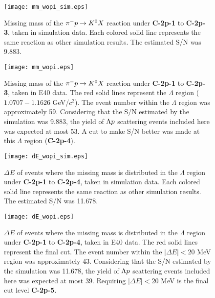 \begin{figure}[!h]
  \begin{center}
    \texttt{[image: mm\_wopi\_sim.eps]}
    \caption{Missing mass of the $\pi^- p \to K^0 X$ reaction under {\bf C-2p-1} to {\bf C-2p-3}, taken in simulation data. Each colored solid line represents the same reaction as other simulation results. The estimated S/N was 9.883.}
    \label{fig-mm_wopi_sim}
  \end{center}
\end{figure}

\begin{figure}[!h]
  \begin{center}
    \texttt{[image: mm\_wopi.eps]}
    \caption{Missing mass of the $\pi^- p \to K^0 X$ reaction under {\bf C-2p-1} to {\bf C-2p-3}, taken in E40 data. The red solid lines represent the $\Lambda$ region ($1.0707-1.1626$ GeV/$c^{2}$). The event number within the $\Lambda$ region was approximately 59. Considering that the S/N estimated by the simulation was 9.883, the yield of $\Lambda p$ scattering events included here was expected at most 53. A cut to make S/N better was made at this $\Lambda$ region ({\bf C-2p-4}).}
    \label{fig-mm_wopi}
  \end{center}
\end{figure}

\begin{figure}[!h]
  \begin{center}
    \texttt{[image: dE\_wopi\_sim.eps]}
    \caption{$\Delta E$ of events where the missing mass is distributed in the $\Lambda$ region under {\bf C-2p-1} to {\bf C-2p-4}, taken in simulation data. Each colored solid line represents the same reaction as other simulation results. The estimated S/N was 11.678.}
    \label{fig-dE_wopi_sim}
  \end{center}
\end{figure}

\begin{figure}[!h]
  \begin{center}
    \texttt{[image: dE\_wopi.eps]}
    \caption{$\Delta E$ of events where the missing mass is distributed in the $\Lambda$ region under {\bf C-2p-1} to {\bf C-2p-4}, taken in E40 data. The red solid lines represent the final cut. The event number within the $|\Delta E|<20$ MeV region was approximately 43. Considering that the S/N estimated by the simulation was 11.678, the yield of $\Lambda p$ scattering events included here was expected at most 39. Requiring $|\Delta E|<20$ MeV is the final cut level {\bf C-2p-5}.}
    \label{fig-dE_wopi}
  \end{center}
\end{figure}




